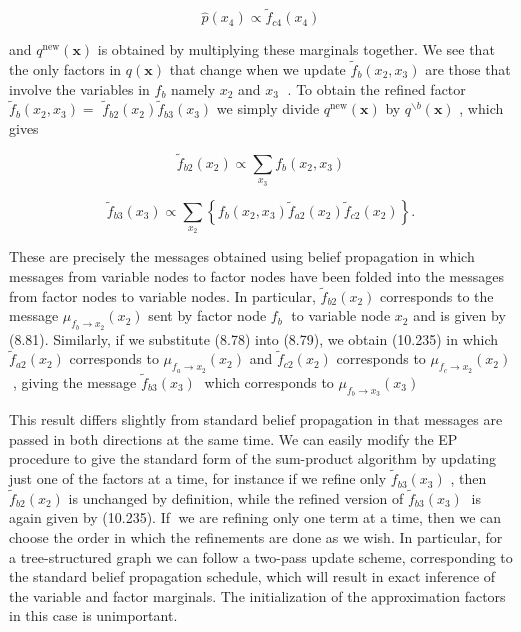 \documentclass[
  10
]{article}
\begin{document}
\[
\widehat {p} (x _ {4}) \propto \widetilde {f} _ {c 4} (x _ {4})\tag{10.233}
\]

and \(q ^ { \mathrm { n e w } } ( \mathbf { x } )\) is obtained by
multiplying these marginals together. We see that the only factors in
\(q ( \mathbf { x } )\) that change when we update
\(\widetilde { f } _ { b } ( x _ { 2 } , x _ { 3 } )\) are those that
involve the variables in \(f _ { b }\) namely \(x _ { 2 }\) and
\(x _ { 3 }\) . To obtain the refined factor
\(\widetilde { f } _ { b } ( x _ { 2 } , x _ { 3 } ) =\)
\(\widetilde { f } _ { b 2 } ( x _ { 2 } ) \widetilde { f } _ { b 3 } ( x _ { 3 } )\)
we simply divide \(q ^ { \mathrm { n e w } } ( \mathbf { x } )\) by
\(q ^ { \backslash b } ( { \mathbf { x } } )\) , which gives

\[
\widetilde {f} _ {b 2} (x _ {2}) \propto \sum_ {x _ {3}} f _ {b} (x _ {2}, x _ {3})\tag{10.234}
\]

\[
\widetilde {f} _ {b 3} (x _ {3}) \propto \sum_ {x _ {2}} \left\{f _ {b} (x _ {2}, x _ {3}) \widetilde {f} _ {a 2} (x _ {2}) \widetilde {f} _ {c 2} (x _ {2}) \right\}.\tag{10.235}
\]

These are precisely the messages obtained using belief propagation in
which messages from variable nodes to factor nodes have been folded into
the messages from factor nodes to variable nodes. In particular,
\(\widetilde { f } _ { b 2 } ( x _ { 2 } )\) corresponds to the message
\(\mu _ { f _ { b } \to x _ { 2 } } ( x _ { 2 } )\) sent by factor node
\(f _ { b }\) to variable node \(x _ { 2 }\) and is given by (8.81).
Similarly, if we substitute (8.78) into (8.79), we obtain (10.235) in
which \(\widetilde { f } _ { a 2 } ( x _ { 2 } )\) corresponds to
\(\mu _ { f _ { a } \to x _ { 2 } } ( x _ { 2 } )\) and
\(\widetilde { f } _ { c 2 } ( x _ { 2 } )\) corresponds to
\(\mu _ { f _ { c } \to x _ { 2 } } ( x _ { 2 } )\) , giving the message
\(\widetilde { f } _ { b 3 } ( x _ { 3 } )\) which corresponds to
\(\mu _ { f _ { b } \to x _ { 3 } } ( x _ { 3 } )\)

This result differs slightly from standard belief propagation in that
messages are passed in both directions at the same time. We can easily
modify the EP procedure to give the standard form of the sum-product
algorithm by updating just one of the factors at a time, for instance if
we refine only \(\widetilde { f } _ { b 3 } ( x _ { 3 } )\) , then
\(\widetilde { f } _ { b 2 } ( x _ { 2 } )\) is unchanged by definition,
while the refined version of
\(\widetilde { f } _ { b 3 } ( x _ { 3 } )\) is again given by (10.235).
If we are refining only one term at a time, then we can choose the order
in which the refinements are done as we wish. In particular, for a
tree-structured graph we can follow a two-pass update scheme,
corresponding to the standard belief propagation schedule, which will
result in exact inference of the variable and factor marginals. The
initialization of the approximation factors in this case is unimportant.
\end{document}
